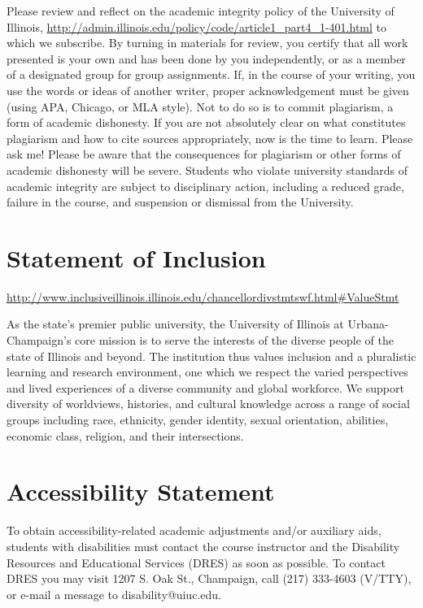 \documentclass[]{article}
\begin{document}
Please review and reflect on the academic integrity policy of the
University of Illinois,
\url{http://admin.illinois.edu/policy/code/article1_part4_1-401.html} to
which we subscribe. By turning in materials for review, you certify that
all work presented is your own and has been done by you independently,
or as a member of a designated group for group assignments. If, in the
course of your writing, you use the words or ideas of another writer,
proper acknowledgement must be given (using APA, Chicago, or MLA style).
Not to do so is to commit plagiarism, a form of academic dishonesty. If
you are not absolutely clear on what constitutes plagiarism and how to
cite sources appropriately, now is the time to learn. Please ask me!
Please be aware that the consequences for plagiarism or other forms of
academic dishonesty will be severe. Students who violate university
standards of academic integrity are subject to disciplinary action,
including a reduced grade, failure in the course, and suspension or
dismissal from the University.

\section{Statement of Inclusion}\label{statement-of-inclusion}

\url{http://www.inclusiveillinois.illinois.edu/chancellordivstmtswf.html\#ValueStmt}

As the state's premier public university, the University of Illinois at
Urbana-Champaign's core mission is to serve the interests of the diverse
people of the state of Illinois and beyond. The institution thus values
inclusion and a pluralistic learning and research environment, one which
we respect the varied perspectives and lived experiences of a diverse
community and global workforce. We support diversity of worldviews,
histories, and cultural knowledge across a range of social groups
including race, ethnicity, gender identity, sexual orientation,
abilities, economic class, religion, and their intersections.

\section{Accessibility Statement}\label{accessibility-statement}

To obtain accessibility-related academic adjustments and/or auxiliary
aids, students with disabilities must contact the course instructor and
the Disability Resources and Educational Services (DRES) as soon as
possible. To contact DRES you may visit 1207 S. Oak St., Champaign, call
(217) 333-4603 (V/TTY), or e-mail a message to disability@uiuc.edu.
\end{document}
